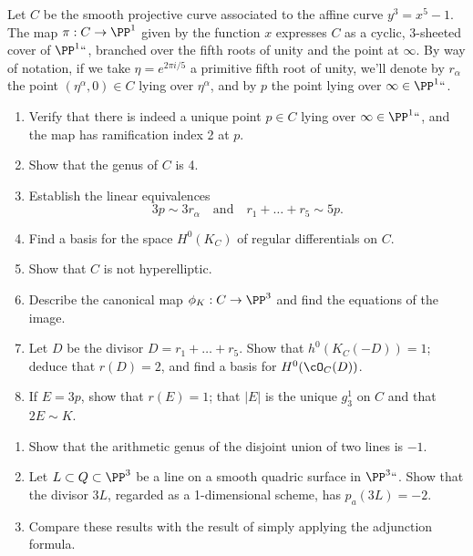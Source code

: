 \begin{exercise}
Let $C$ be the smooth projective curve associated to the affine curve
$y^3 = x^5 -1$. 
The map $\pi : C \to \PP^1$ given by the
function $x$ expresses $C$ as a cyclic, 3-sheeted cover of $\PP^1` `$,
branched over the fifth roots of unity and the point at $\infty$. By
way of notation, if we take $\eta = e^{2\pi i/5}$ a primitive fifth
root of unity, we'll denote by $r_\alpha$ the point $(\eta^\alpha, 0)
\in C$ lying over $\eta^\alpha$, and by $p$ the point lying over
$\infty \in \PP^1` `$.

\begin{enumerate}
\item Verify that there is indeed a unique point $p \in C$ lying over $\infty \in \PP^1` `$, and the map has ramification index 2 at $p$. 
\item Show that the genus of $C$ is 4.
\item Establish the linear equivalences
$$
3p \sim 3r_\alpha \quad \text{and} \quad r_1+ \dots + r_5 \sim 5p.
$$
\item Find a basis for the space $H^0(K_C)$ of regular differentials on $C$.
\item Show that $C$ is not hyperelliptic.
\item Describe the canonical map $\phi_K : C \to \PP^3$ and find the equations of the image.
\item Let $D$ be the divisor $D = r_1+\dots+r_5$. Show that $h^0(K_C(-D)) = 1$; deduce that $r(D) = 2$, and find a basis for $H^0(\cO_C(D))$.
\item If $E = 3p$, show that $r(E) = 1$; that $|E|$ is the unique $g^1_3$ on $C$ and that $2E \sim K$.
\end{enumerate}
\end{exercise}


\begin{exercise}\label{pa example}
\begin{enumerate}
 \item Show that the 
%
%
arithmetic genus
of the disjoint union of two lines is $-1$.
\item Let $L\subset Q\subset \PP^3$ be a line on a smooth quadric surface in $\PP^3` `$. Show that the 
divisor $3L$, regarded as a 1-dimensional scheme, has $p_a(3L) = -2$.
\item Compare these results with the result of simply applying the adjunction formula.
\end{enumerate}
\end{exercise}

